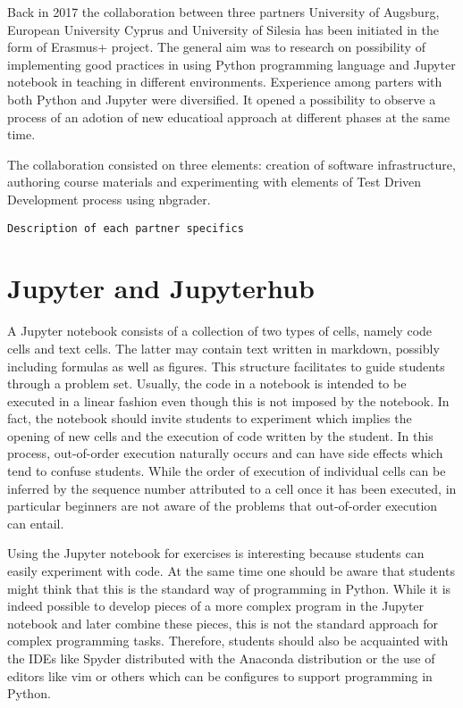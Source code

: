 \documentclass[twocolumn]{svjour3}          %
\begin{document}
Back in 2017 the collaboration between three partners University of
Augsburg, European University Cyprus and University of Silesia has
been initiated in the form of Erasmus+ project. The general aim was to
research on possibility of implementing good practices in using Python
programming language and Jupyter notebook in teaching in different
environments. Experience among parters with both Python and Jupyter
were diversified. It opened a possibility to observe a process of an
adotion of new educatioal approach at different phases at the same
time.

The collaboration consisted on three elements: creation of software
infrastructure, authoring course materials and experimenting with
elements of Test Driven Development process using nbgrader.


\texttt{Description of each partner specifics} 


\section{Jupyter and Jupyterhub}
\label{sec:jupyter_jupyterhub}

A Jupyter notebook consists of a collection of two types of cells, namely code
cells and text cells. The latter may contain text written in markdown, possibly
including formulas as well as figures. This structure facilitates to guide
students through a problem set. Usually, the code in a notebook is intended to
be executed in a linear fashion even though this is not imposed by the
notebook. In fact, the notebook should invite students to experiment which
implies the opening of new cells and the execution of code written by the
student. In this process, out-of-order execution naturally occurs and can have
side effects which tend to confuse students. While the order of execution of
individual cells can be inferred by the sequence number attributed to a cell
once it has been executed, in particular beginners are not aware of the
problems that out-of-order execution can entail.

Using the Jupyter notebook for exercises is interesting because students can
easily experiment with code. At the same time one should be aware that students
might think that this is the standard way of programming in Python. While it is
indeed possible to develop pieces of a more complex program in the Jupyter 
notebook and later combine these pieces, this is not the standard approach for
complex programming tasks. Therefore, students should also be acquainted with
the IDEs like Spyder distributed with the Anaconda distribution or the use of
editors like vim or others which can be configures to support programming in
Python.
\end{document}
